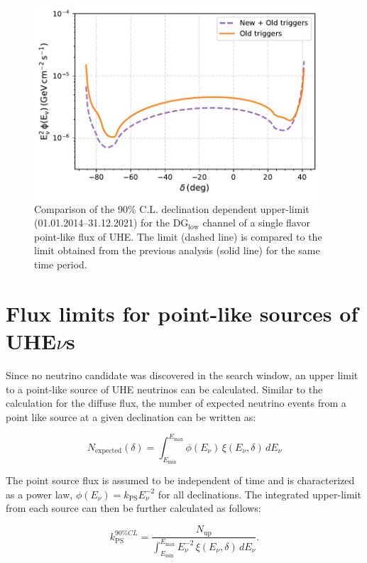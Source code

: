 \begin{figure}[t!]
  \centering
  \includegraphics[width=0.95\textwidth]{thesis_figures/PointLimits/Point_comp_new_old.pdf}
  \caption{Comparison of the 90\% C.L. declination dependent upper-limit (01.01.2014–31.12.2021) for the DG$_{\text{low}}$ channel of a single flavor point-like flux of UHE. The limit (dashed line) is compared to the limit obtained from the previous analysis (solid line) for the same time period.}
  \label{fig:Dec_limit_new old}
\end{figure}

\section{Flux limits for point-like sources of UHE\texorpdfstring{$\nu$s}{}}
\label{sec:pfux_limit}
Since no neutrino candidate was discovered in the search window, an upper limit to a  point-like source of UHE neutrinos can be calculated. Similar to the calculation for the diffuse flux, the number of expected neutrino events from a point like source at a given declination can be written as:

\begin{equation}
  N_{\text{expected}}(\delta) = \int_{E_{\text{min}}}^{E_{\text{max}}}  \phi(E_{\nu}) \, \xi(E_{\nu}, \delta) \, dE_{\nu}
\end{equation}

The point source flux is assumed to be independent of time and is characterized as a power law, $\phi(E_{\nu}) = k_{\text{PS}} E_{\nu}^{-2}$ for all declinations. The integrated upper-limit from each source can then be further calculated as follows:

\begin{equation}
  \label{eq:point_flux_limit}
  k_{\text{PS}}^{90\%CL} = \frac{N_{\text{up}}}{\int_{E_{\text{min}}}^{E_{\text{max}}} E_{\nu}^{-2} \, \xi(E_{\nu}, \delta) \, dE_{\nu}}.
\end{equation}

